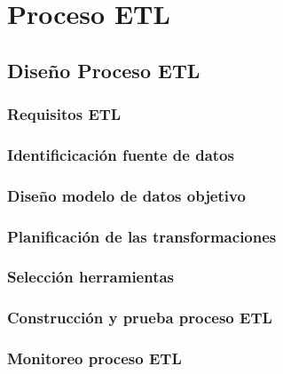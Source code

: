 \documentclass{report}
\begin{document}
\chapter{Proceso ETL}

\section{Diseño Proceso ETL}


\subsection{Requisitos ETL}


\subsection{Identificicación fuente de datos}


\subsection{Diseño modelo de datos objetivo}


\subsection{Planificación de las transformaciones}


\subsection{Selección herramientas}


\subsection{Construcción y prueba proceso ETL}


\subsection{Monitoreo proceso ETL}




\end{document}
